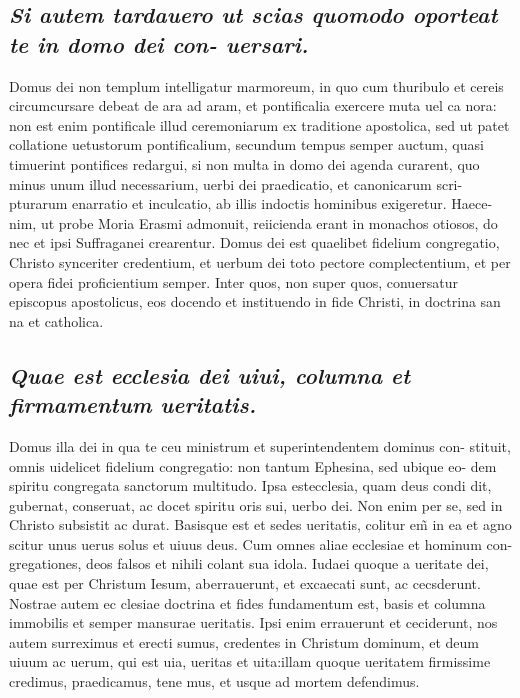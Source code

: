 \documentclass{article}
\begin{document}
\begin{pages}
\subsection*{\textit{Si autem tardauero ut scias quomodo oporteat te in domo dei con- uersari. }}\pstart Domus dei non templum intelligatur marmoreum, in quo cum thuribulo et cereis circumcursare debeat de ara ad aram, et pontificalia exercere muta uel ca nora: non est enim pontificale illud ceremoniarum ex traditione apostolica, sed ut patet collatione uetustorum pontificalium, secundum tempus semper auctum, quasi timuerint pontifices redargui, si non multa in domo dei agenda curarent, quo minus unum illud necessarium, uerbi dei praedicatio, et canonicarum scri- pturarum enarratio et inculcatio, ab illis indoctis hominibus exigeretur. Haece- nim, ut probe Moria Erasmi admonuit, reiicienda erant in monachos otiosos, do nec et ipsi Suffraganei crearentur. Domus dei est quaelibet fidelium congregatio, Christo synceriter credentium, et uerbum dei toto pectore complectentium, et per opera fidei proficientium semper. Inter quos, non super quos, conuersatur episcopus apostolicus, eos docendo et instituendo in fide Christi, in doctrina san na et catholica.  \pend
{}
{}
\subsection*{\textit{Quae est ecclesia dei uiui, columna et firmamentum ueritatis. }}\pstart Domus illa dei in qua te ceu ministrum et superintendentem dominus con- stituit, omnis uidelicet fidelium congregatio: non tantum Ephesina, sed ubique eo- dem spiritu congregata sanctorum multitudo. Ipsa estecclesia, quam deus condi dit, gubernat, conseruat, ac docet spiritu oris sui, uerbo dei. Non enim per se, sed in Christo subsistit ac durat. Basisque est et sedes ueritatis, colitur em̃ in ea et agno scitur unus uerus solus et uiuus deus. Cum omnes aliae ecclesiae et hominum con- gregationes, deos falsos et nihili colant sua idola. Iudaei quoque a ueritate dei, quae est per Christum Iesum, aberrauerunt, et excaecati sunt, ac cecsderunt. Nostrae autem ec clesiae doctrina et fides fundamentum est, basis et columna immobilis et semper mansurae ueritatis. Ipsi enim errauerunt et ceciderunt, nos autem surreximus et erecti sumus, credentes in Christum dominum, et deum uiuum ac uerum, qui est uia, ueritas et uita:illam quoque ueritatem firmissime credimus, praedicamus, tene mus, et usque ad mortem defendimus.  \pend
{}
{}

\end{pages}
\end{document}
